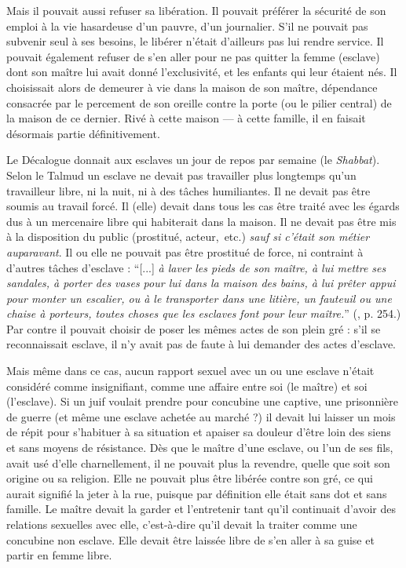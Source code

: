  Mais il pouvait aussi refuser sa libération. Il pouvait préférer la sécurité de son emploi à la vie hasardeuse d'un pauvre, d'un journalier. S'il ne pouvait pas subvenir seul à ses besoins, le libérer n'était d'ailleurs pas lui rendre service. Il pouvait également refuser de s'en aller pour ne pas quitter la femme (esclave) dont son maître lui avait donné l'exclusivité, et les enfants qui leur étaient nés. Il choisissait alors de demeurer à vie dans la maison de son maître, dépendance consacrée par le percement de son oreille contre la porte (ou le pilier central) de la maison de ce dernier. Rivé à cette maison --- à cette famille, il en faisait désormais partie définitivement.

 Le Décalogue donnait aux esclaves un jour de repos par semaine (le \emph{Shabbat}). Selon le Talmud un esclave ne devait pas travailler plus longtemps qu'un travailleur libre, ni la nuit, ni à des tâches humiliantes. Il ne devait pas être soumis au travail forcé. Il (elle) devait dans tous les cas être traité avec les égards dus à un mercenaire libre qui habiterait dans la maison. Il ne devait pas être mis à la disposition du public (prostitué, acteur,~etc.) \emph{sauf si c'était son métier auparavant}. Il ou elle ne pouvait pas être prostitué de force, ni contraint à d'autres tâches d'esclave : \enquote{[...] \emph{à laver les pieds de son maître, à lui mettre ses sandales, à porter des vases pour lui dans la maison des bains, à lui prêter appui pour monter un escalier, ou à le transporter dans une litière, un fauteuil ou une chaise à porteurs, toutes choses que les esclaves font pour leur maître.}} (, p. 254.) Par contre il pouvait choisir de poser les mêmes actes de son plein gré : s'il se reconnaissait esclave, il n'y avait pas de faute à lui demander des actes d'esclave.

 Mais même dans ce cas, aucun rapport sexuel avec un ou une esclave n'était considéré comme insignifiant, comme une affaire entre soi (le maître) et soi (l'esclave). Si un juif voulait prendre pour concubine une captive, une prisonnière de guerre (et même une esclave achetée au marché ?) il devait lui laisser un mois de répit pour s'habituer à sa situation et apaiser sa douleur d'être loin des siens et sans moyens de résistance. Dès que le maître d'une esclave, ou l'un de ses fils, avait usé d'elle charnellement, il ne pouvait plus la revendre, quelle que soit son origine ou sa religion. Elle ne pouvait plus être libérée contre son gré, ce qui aurait signifié la jeter à la rue, puisque par définition elle était sans dot et sans famille. Le maître devait la garder et l'entretenir tant qu'il continuait d'avoir des relations sexuelles avec elle, c'est-à-dire qu'il devait la traiter comme une concubine non esclave. Elle devait être laissée libre de s'en aller à sa guise et partir en femme libre.

